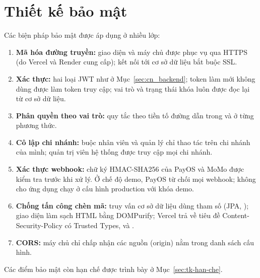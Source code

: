 \section{Thiết kế bảo mật}
\label{sec:thietke_baomat}

Các biện pháp bảo mật được áp dụng ở nhiều lớp:
\begin{enumerate}
    \item \textbf{Mã hóa đường truyền:} giao diện và máy chủ được phục vụ qua HTTPS (do Vercel và Render cung cấp); kết nối tới cơ sở dữ liệu bắt buộc SSL.
    \item \textbf{Xác thực:} hai loại JWT như ở Mục~\ref{sec:cn_backend}; token làm mới không dùng được làm token truy cập; vai trò và trạng thái khóa luôn được đọc lại từ cơ sở dữ liệu.
    \item \textbf{Phân quyền theo vai trò:} quy tắc theo tiền tố đường dẫn trong  và  ở từng phương thức.
    \item \textbf{Cô lập chi nhánh:}  buộc nhân viên và quản lý chỉ thao tác trên chi nhánh của mình; quản trị viên hệ thống được truy cập mọi chi nhánh.
    \item \textbf{Xác thực webhook:} chữ ký HMAC-SHA256 của PayOS và MoMo được kiểm tra trước khi xử lý. Ở chế độ demo, PayOS từ chối mọi webhook;  không cho ứng dụng chạy ở cấu hình production với khóa demo.
    \item \textbf{Chống tấn công chèn mã:} truy vấn cơ sở dữ liệu dùng tham số (JPA, ); giao diện làm sạch HTML bằng DOMPurify; Vercel trả về tiêu đề Content-Security-Policy có Trusted Types,  và .
    \item \textbf{CORS:} máy chủ chỉ chấp nhận các nguồn (origin) nằm trong danh sách cấu hình.
\end{enumerate}
Các điểm bảo mật còn hạn chế được trình bày ở Mục~\ref{sec:tk-han-che}.
